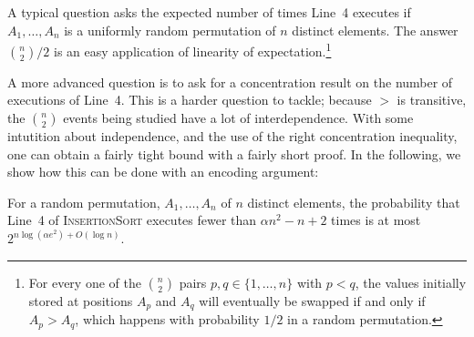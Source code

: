 \documentclass[lotsofwhite]{patmorin}
\begin{document}
A typical question asks the expected number of times Line~4 executes
if $A_1,\ldots,A_n$ is a uniformly random permutation of $n$ distinct
elements.  The answer $\binom{n}{2}/2$ is an easy application of
linearity of expectation.\footnote{For every one of the $\binom{n}{2}$
pairs $p,q\in\{1,\ldots,n\}$ with $p<q$, the values initially stored at
positions $A_p$ and $A_q$ will eventually be swapped if and only if $A_p >
A_q$, which happens with probability $1/2$ in a random permutation.}

A more advanced question is to ask for a concentration result on the
number of executions of Line~4. This is a harder question to tackle;
because $>$ is transitive, the $\binom{n}{2}$ events being studied have
a lot of interdependence.  With some intutition about independence, and
the use of the right concentration inequality, one can obtain a fairly
tight bound with a fairly short proof.  In the following, we show how
this can be done with an encoding argument:

\begin{thm}
For a random permutation, $A_1,\ldots,A_n$ of $n$ distinct elements,
the probability that Line~4 of \textsc{InsertionSort} executes fewer than
$\alpha n^2 - n + 2$ times is at most $2^{n\log(\alpha e^2)+O(\log n)}$.
\end{thm}
\end{document}
